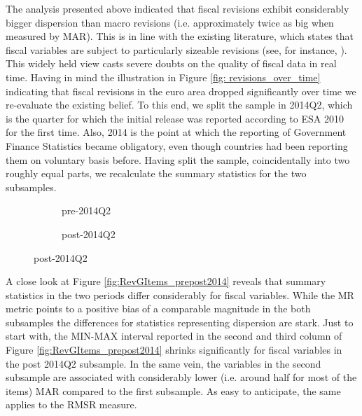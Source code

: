 The analysis presented above indicated that fiscal revisions exhibit considerably bigger dispersion than macro revisions (i.e. approximately twice as big when measured by MAR). This is in line with the existing literature, which states that fiscal variables are subject to particularly sizeable revisions (see, for instance, \citet{Cimadomo_2016_jes}). This widely held view casts severe doubts on the quality of fiscal data in real time. Having in mind the illustration in Figure \ref{fig: revisions_over_time} indicating that fiscal revisions in the euro area dropped significantly over time we re-evaluate the existing belief. To this end, we split the sample in 2014Q2, which is the quarter for which the initial release was reported according to ESA 2010 for the first time. Also, 2014 is the point at which the reporting of Government Finance Statistics became obligatory, even though countries had been reporting them on voluntary basis before. Having split the sample, coincidentally into two roughly equal parts, we recalculate the summary statistics for the two subsamples.

\begin{figure}
     \centering
     \caption{Summary statistics of final revisions in the two subsamples \label{fig:RevGItems_prepost2014}}
     \begin{subfigure}[b]{\textwidth}
         \centering
         \caption{pre-2014Q2}         
              
     \end{subfigure}
     \vfill
     \begin{subfigure}[b]{\textwidth}
         \centering
         \caption{post-2014Q2}
              
     \end{subfigure}
    \end{figure}
\restoregeometry


A close look at Figure \ref{fig:RevGItems_prepost2014} reveals that summary statistics in the two periods differ considerably for fiscal variables. While the MR metric points to a positive bias of a comparable magnitude in the both subsamples the differences for statistics representing dispersion are stark. Just to start with, the MIN-MAX interval reported in the second and third column of Figure \ref{fig:RevGItems_prepost2014} shrinks significantly for fiscal variables in the post 2014Q2 subsample. In the same vein, the variables in the second subsample are associated with considerably lower (i.e. around half for most of the items) MAR compared to the first subsample. As easy to anticipate, the same applies to the RMSR measure. 

